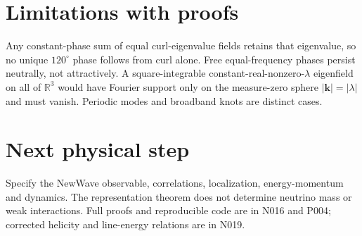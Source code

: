 \documentclass[11pt]{article}
\begin{document}
\section{Limitations with proofs}
Any constant-phase sum of equal curl-eigenvalue fields retains that eigenvalue, so no unique $120^\circ$ phase follows from curl alone. Free equal-frequency phases persist neutrally, not attractively. A square-integrable constant-real-nonzero-$\lambda$ eigenfield on all of $\mathbb R^3$ would have Fourier support only on the measure-zero sphere $|\mathbf k|=|\lambda|$ and must vanish. Periodic modes and broadband knots are distinct cases.
\section{Next physical step}
Specify the NewWave observable, correlations, localization, energy-momentum and dynamics. The representation theorem does not determine neutrino mass or weak interactions. Full proofs and reproducible code are in N016 and P004; corrected helicity and line-energy relations are in N019.
\end{document}
